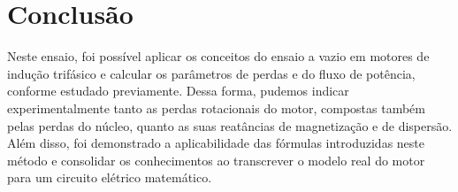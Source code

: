 \documentclass[a4paper,12pt,oneside]{article}
\begin{document}
\newpage
\section{Conclusão}\hspace{0cm}

Neste ensaio, foi possível aplicar os conceitos do ensaio a vazio em motores de indução trifásico e calcular os parâmetros de perdas e do fluxo de potência, conforme estudado previamente. Dessa forma, pudemos indicar experimentalmente tanto as perdas rotacionais do motor, compostas também pelas perdas do núcleo, quanto as suas reatâncias de magnetização e de dispersão. Além disso, foi demonstrado a aplicabilidade das fórmulas introduzidas neste método e consolidar os conhecimentos ao transcrever o modelo real do motor para um circuito elétrico matemático.



\newpage
{}


\end{document}
